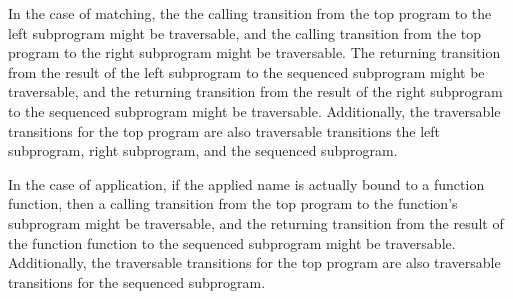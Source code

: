 \documentclass[10pt]{article}
\begin{document}
In the case of matching, the the calling transition from the top program to
the left subprogram might be traversable, and
the calling transition from the top program to the
right subprogram might be traversable.  The returning transition from the result of the
left subprogram to the sequenced subprogram might be traversable, and the returning
transition from the result of the right subprogram to the sequenced subprogram might be
traversable.  Additionally, the traversable transitions for the top program are also
traversable transitions the left subprogram, right subprogram, and the sequenced subprogram.   

In the case of application, if the applied name is actually bound to a function
function, then a calling transition from the top program to the function's subprogram
might be traversable, and the returning transition from the result of the function
function to the sequenced subprogram might be traversable.
Additionally, the traversable transitions for the top program are also
traversable transitions for the sequenced subprogram. 
\end{document}
